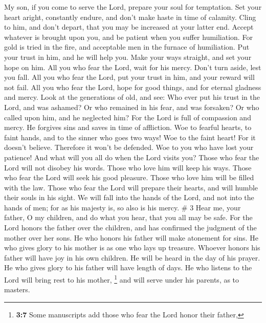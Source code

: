 My son, if you come to serve the Lord, prepare your soul
for temptation.  Set your heart aright, constantly endure,
and don't make haste in time of calamity.  Cling to him,
and don't depart, that you may be increased at your latter end.
 Accept whatever is brought upon you, and be patient when
you suffer humiliation.  For gold is tried in the fire,
and acceptable men in the furnace of humiliation.  Put
your trust in him, and he will help you. Make your ways straight, and
set your hope on him.  All you who fear the Lord, wait for
his mercy. Don't turn aside, lest you fall.  All you who
fear the Lord, put your trust in him, and your reward will not fail.
 All you who fear the Lord, hope for good things, and for
eternal gladness and mercy.  Look at the generations of
old, and see: Who ever put his trust in the Lord, and was ashamed? Or
who remained in his fear, and was forsaken? Or who called upon him, and
he neglected him?  For the Lord is full of compassion and
mercy. He forgives sins and saves in time of affliction. 
Woe to fearful hearts, to faint hands, and to the sinner who goes two
ways!  Woe to the faint heart! For it doesn't believe.
Therefore it won't be defended.  Woe to you who have lost
your patience! And what will you all do when the Lord visits you?
 Those who fear the Lord will not disobey his words.
Those who love him will keep his ways.  Those who fear
the Lord will seek his good pleasure. Those who love him will be filled
with the law.  Those who fear the Lord will prepare their
hearts, and will humble their souls in his sight.  We
will fall into the hands of the Lord, and not into the hands of men; for
as his majesty is, so also is his mercy. \# 3  Hear me,
your father, O my children, and do what you hear, that you all may be
safe.  For the Lord honors the father over the children,
and has confirmed the judgment of the mother over her sons.
 He who honors his father will make atonement for sins.
 He who gives glory to his mother is as one who lays up
treasure.  Whoever honors his father will have joy in his
own children. He will be heard in the day of his prayer. 
He who gives glory to his father will have length of days. He who
listens to the Lord will bring rest to his mother, 
\footnote{\textbf{3:7} Some manuscripts add those who fear the Lord
  honor their father,} and will serve under his parents, as to masters.
